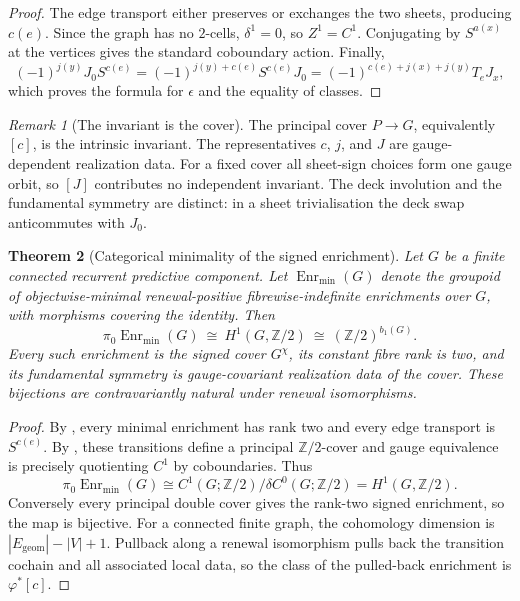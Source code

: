 \documentclass[11pt]{article}
\newtheorem{theorem}{Theorem}[section]
\theoremstyle{definition}
\theoremstyle{remark}
\newtheorem{remark}[theorem]{Remark}
\newcommand{\Z}{\mathbb{Z}}
\begin{document}
\begin{proof}
The edge transport either preserves or exchanges the two sheets, producing
\(c(e)\).  Since the graph has no \(2\)-cells, \(\delta^1=0\), so
\(Z^1=C^1\).  Conjugating by \(S^{a(x)}\) at the vertices gives the standard
coboundary action.  Finally,
\[
 (-1)^{j(y)}J_0S^{c(e)}
 =(-1)^{j(y)+c(e)}S^{c(e)}J_0
 =(-1)^{c(e)+j(x)+j(y)}T_eJ_x,
\]
which proves the formula for \(\epsilon\) and the equality of classes.
\end{proof}

\begin{remark}[The invariant is the cover]
\label{rem:cover-is-invariant}
The principal cover \(P\to G\), equivalently \([c]\), is the intrinsic invariant.
The representatives \(c\), \(j\), and \(J\) are gauge-dependent realization
data.  For a fixed cover all sheet-sign choices form one gauge orbit, so
\([J]\) contributes no independent invariant.  The deck involution and the
fundamental symmetry are distinct: in a sheet trivialisation the deck swap
anticommutes with \(J_0\).
\end{remark}

\begin{theorem}[Categorical minimality of the signed enrichment]
\label{thm:classification}
Let \(G\) be a finite connected recurrent predictive component.  Let
\(\operatorname{Enr}_{\min}(G)\) denote the groupoid of objectwise-minimal
renewal-positive fibrewise-indefinite enrichments over \(G\), with morphisms
covering the identity.  Then
\[
  \boxed{\qquad
  \pi_0\operatorname{Enr}_{\min}(G)
  \ \cong\ H^1(G,\Z/2)
  \ \cong\ (\Z/2)^{b_1(G)}.
  \qquad}
\]
Every such enrichment is the signed cover \(G^\chi\), its constant fibre rank is
two, and its fundamental symmetry is gauge-covariant realization data of the
cover.  These bijections are contravariantly natural under renewal
isomorphisms.
\end{theorem}

\begin{proof}
By , every minimal enrichment has rank two and every
edge transport is \(S^{c(e)}\).  By
, these transitions define a principal
\(\Z/2\)-cover and gauge equivalence is precisely quotienting \(C^1\) by
coboundaries.  Thus
\[
 \pi_0\operatorname{Enr}_{\min}(G)
 \cong C^1(G;\Z/2)/\delta C^0(G;\Z/2)
 =H^1(G,\Z/2).
\]
Conversely every principal double cover gives the rank-two signed enrichment,
so the map is bijective.  For a connected finite graph, the cohomology dimension
is \(|E_{\mathrm{geom}}|-|V|+1\).  Pullback along a renewal isomorphism pulls back
the transition cochain and all associated local data, so the class of the
pulled-back enrichment is \(\varphi^*[c]\).
\end{proof}
\end{document}
